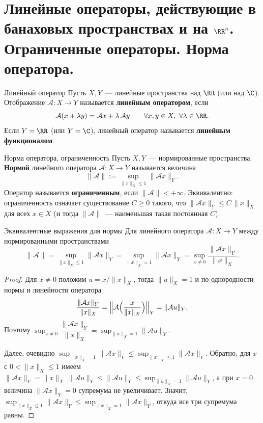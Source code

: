 
\section{Линейные операторы, действующие в банаховых пространствах и на $\RR^n$. Ограниченные операторы. Норма оператора.}

\begin{Definition}[required]{Линейный оператор}{}
	Пусть $X, Y$~--- линейные пространства над $\RR$ (или над $\C$). Отображение $\mathcal{A}\colon X \to Y$ называется \textbf{линейным оператором}, если
	\[
	\mathcal{A}(x + \lambda y) = \mathcal{A}x + \lambda\,\mathcal{A}y \qquad \forall x, y \in X,\ \forall \lambda \in \RR.
	\]
	Если $Y = \RR$ (или $Y=\C$), линейный оператор называется \textbf{линейным функционалом}.
\end{Definition}

\begin{Definition}[required]{Норма оператора, ограниченность}{}
	Пусть $X, Y$~--- нормированные пространства. \textbf{Нормой} линейного оператора $\mathcal{A}\colon X \to Y$ называется величина
	\[
	\|\mathcal{A}\| := \sup_{\|x\|_X \le 1} \|\mathcal{A}x\|_Y.
	\]
	Оператор называется \textbf{ограниченным}, если $\|\mathcal{A}\| < +\infty$. Эквивалентно: ограниченность означает существование $C \ge 0$ такого, что $\|\mathcal{A}x\|_Y \le C\,\|x\|_X$ для всех $x \in X$ (и тогда $\|\mathcal{A}\|$~--- наименьшая такая постоянная $C$).
\end{Definition}

\begin{Proposition}{Эквивалентные выражения для нормы}{}
	Для линейного оператора $\mathcal{A}\colon X \to Y$ между нормированными пространствами
	\[
	\|\mathcal{A}\| = \sup_{\|x\|_X \le 1} \|\mathcal{A}x\|_Y = \sup_{\|x\|_X = 1} \|\mathcal{A}x\|_Y = \sup_{x \neq 0} \frac{\|\mathcal{A}x\|_Y}{\|x\|_X}.
	\]
\end{Proposition}

\begin{proof}
	Для $x \neq 0$ положим $u = x/\|x\|_X$, тогда $\|u\|_X = 1$ и по однородности нормы и линейности оператора
	\[
	\frac{\|\mathcal{A}x\|_Y}{\|x\|_X} = \Bigl\| \mathcal{A}\Bigl(\frac{x}{\|x\|_X}\Bigr) \Bigr\|_Y = \|\mathcal{A}u\|_Y.
	\]
	Поэтому $\sup_{x \neq 0} \dfrac{\|\mathcal{A}x\|_Y}{\|x\|_X} = \sup_{\|u\|_X = 1}\|\mathcal{A}u\|_Y$.

	Далее, очевидно $\sup_{\|x\|_X = 1}\|\mathcal{A}x\|_Y \le \sup_{\|x\|_X \le 1}\|\mathcal{A}x\|_Y$. Обратно, для $x$ с $0 < \|x\|_X \le 1$ имеем $\|\mathcal{A}x\|_Y = \|x\|_X\,\|\mathcal{A}u\|_Y \le \|\mathcal{A}u\|_Y \le \sup_{\|u\|_X=1}\|\mathcal{A}u\|_Y$, а при $x = 0$ величина $\|\mathcal{A}x\|_Y = 0$ супремума не увеличивает. Значит, $\sup_{\|x\|_X \le 1}\|\mathcal{A}x\|_Y \le \sup_{\|x\|_X = 1}\|\mathcal{A}x\|_Y$, откуда все три супремума равны.
\end{proof}


